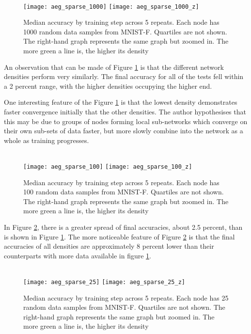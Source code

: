 \begin{figure}[H] 
	 \\
	\texttt{[image: aeg\_sparse\_1000]}
	\texttt{[image: aeg\_sparse\_1000\_z]}
	\caption{Median accuracy by training step across 5 repeats. Each node has 1000 random data samples from MNIST-F. Quartiles are not shown. The right-hand graph represents the same graph but zoomed in. The more green a line is, the higher its density}
	\label{aeg4}
\end{figure}

An observation that can be made of Figure \ref{aeg4} is that the different network densities perform very similarly. The final accuracy for all of the tests fell within a 2 percent range,  with the higher densities occupying the higher end.

One interesting feature of the Figure \ref{aeg4} is that the lowest density demonstrates faster convergence initially that the other densities. The author hypothesises that this may be due to groups of nodes forming local sub-networks which converge on their own sub-sets of data faster, but more slowly combine into the network as a whole as training progresses.

\begin{figure}[H] 
	 \\
	\texttt{[image: aeg\_sparse\_100]}
	\texttt{[image: aeg\_sparse\_100\_z]}
	\caption{Median accuracy by training step across 5 repeats. Each node has 100 random data samples from MNIST-F. Quartiles are not shown. The right-hand graph represents the same graph but zoomed in. The more green a line is, the higher its density}
	\label{aeg5}
\end{figure}

In Figure \ref{aeg5}, there is a greater spread of final accuracies, about 2.5 percent, than is shown in Figure \ref{aeg4}. The more noticeable feature of Figure \ref{aeg5} is that the final accuracies of all densities are approximately 8 percent lower than their counterparts with more data available in figure \ref{aeg4}.

\begin{figure}[H] 
	 \\
	\texttt{[image: aeg\_sparse\_25]}
	\texttt{[image: aeg\_sparse\_25\_z]}
	\caption{Median accuracy by training step across 5 repeats. Each node has 25 random data samples from MNIST-F. Quartiles are not shown. The right-hand graph represents the same graph but zoomed in. The more green a line is, the higher its density}
	\label{aeg6}
\end{figure}

